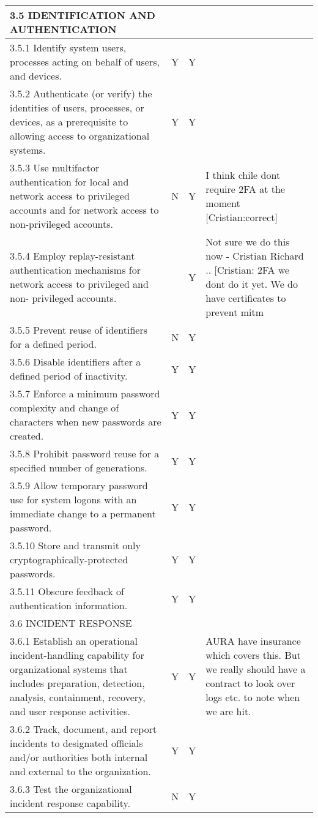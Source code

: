 \begin{longtable} {|p{}|p{}|p{}|p{} |}
{3.5 IDENTIFICATION AND AUTHENTICATION}&&& \\ \hline
{3.5.1 Identify system users, processes acting on behalf of users, and devices.}&{Y}&{Y}& \\ \hline
{3.5.2 Authenticate (or verify) the identities of users, processes, or devices, as a prerequisite to allowing access to organizational systems.}&{Y}&{Y}& \\ \hline
{3.5.3 Use multifactor authentication for local and network access to privileged accounts and for network access to non-privileged accounts.}&{N}&{Y}&{ I think chile dont require 2FA at the moment [Cristian:correct]} \\ \hline
{3.5.4 Employ replay-resistant authentication mechanisms for network access to privileged and non- privileged accounts.}&{}&{Y}&{Not sure we do this now - Cristian Richard .. [Cristian: 2FA we dont do it yet. We do have certificates to prevent mitm} \\ \hline
{3.5.5 Prevent reuse of identifiers for a defined period.}&{N}&{Y}& \\ \hline
{3.5.6 Disable identifiers after a defined period of inactivity.}&{Y}&{Y}& \\ \hline
{3.5.7 Enforce a minimum password complexity and change of characters when new passwords are created.}&{Y}&{Y}& \\ \hline
{3.5.8 Prohibit password reuse for a specified number of generations.}&{Y}&{Y}& \\ \hline
{3.5.9 Allow temporary password use for system logons with an immediate change to a permanent password.}&{Y}&{Y}& \\ \hline
{3.5.10 Store and transmit only cryptographically-protected passwords.}&{Y}&{Y}& \\ \hline
{3.5.11 Obscure feedback of authentication information.}&{Y}&{Y}& \\ \hline
{3.6 INCIDENT RESPONSE}&&& \\ \hline
{3.6.1 Establish an operational incident-handling capability for organizational systems that includes preparation, detection, analysis, containment, recovery, and user response activities.}&{Y}&{Y}&{AURA have insurance which covers this. But we really should have a contract to look over logs etc. to note when we are hit.} \\ \hline
{3.6.2 Track, document, and report incidents to designated officials and/or authorities both internal and external to the organization.}&{Y}&{Y}& \\ \hline
{3.6.3 Test the organizational incident response capability.}&{N}&{Y}& \\ \hline

\end{longtable}
